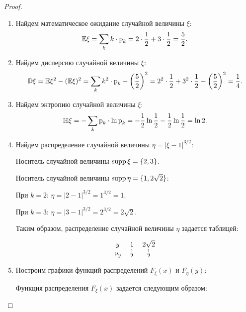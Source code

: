\begin{proof}

  \begin{enumerate}
    \item Найдем математическое ожидание случайной величины $ \xi $:
          \[
            \mathbb E\xi = \sum_{k} k \cdot \textup{p}_{k} = 2 \cdot \frac{1}{2} + 3 \cdot \frac{1}{2} = \frac{5}{2}.
          \]

    \item Найдем дисперсию случайной величины $ \xi $:
          \[
            \mathbb D\xi = \mathbb E\xi^{2} - (\mathbb E\xi)^{2} = \sum_{k} k^{2} \cdot \textup{p}_{k} - \left( \frac{5}{2} \right)^{2} = 2^{2} \cdot \frac{1}{2} + 3^{2} \cdot \frac{1}{2} - \left( \frac{5}{2} \right)^{2} = \frac{1}{4}.
          \]

    \item Найдем энтропию случайной величины $ \xi $:
          \[
            \mathbb H\xi = - \sum_{k} \textup{p}_{k} \cdot \ln \textup{p}_{k} = - \frac{1}{2}  \ln \frac{1}{2} - \frac{1}{2}  \ln \frac{1}{2} = \ln 2.
          \]

    \item Найдем распределение случайной величины $ \eta = |\xi - 1|^{3/2} $:

          Носитель случайной величины $ \operatorname{\mathop{supp}} \xi = \{2, 3\} $.

          Носитель случайной величины $ \operatorname{\mathop{supp}} \eta = \{1, 2\sqrt{2}\} $:

          \subitem При $ k = 2 $: $ \eta = |2 - 1|^{3/2} = 1^{3/2} = 1 $.

          \subitem При $ k = 3 $: $ \eta = |3 - 1|^{3/2} = 2^{3/2} = 2\sqrt{2} $.

          Таким образом, распределение случайной величины $ \eta $ задается таблицей:

          \[
            \begin{tabular}{ccc}
              $y$              & $1$           & $2\sqrt{2}$    \\
              $\textup{p}_{y}$ & $\frac{1}{2}$ & $\frac{1}{2} $ \\
            \end{tabular}
          \]

    \item Построим графики функций распределений $ F_{\xi}(x) $ и $ F_{\eta}(y) $:

          Функция распределения $ F_{\xi}(x) $ задается следующим образом:


\end{enumerate}
\end{proof}

